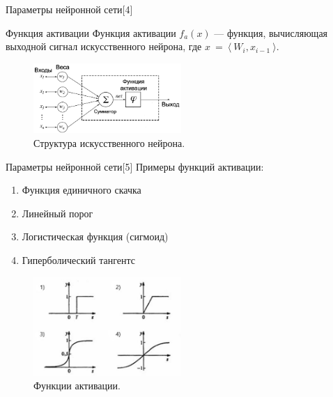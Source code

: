 \documentclass{beamer}
\begin{document}
\begin{frame}{Параметры нейронной сети[4]}
\begin{block}{Функция активации}
Функция активации $f_a(x)$ --- функция, вычисляющая выходной сигнал искусственного нейрона, где $x~=~\langle~W_i, x_{i-1}~\rangle$.
\end{block}

\begin{figure}[h]
    \centering
  \includegraphics[width=0.5\textwidth]{nuron_model.png}
  \caption{Структура искусственного нейрона.}
  \label{fig:neuron}
\end{figure}

\end{frame}






\begin{frame}{Параметры нейронной сети[5]}
Примеры функций активации:
\begin{enumerate}
\item Функция единичного скачка
\item Линейный порог
\item Логистическая функция (сигмоид)
\item Гиперболический тангентс
\end{enumerate}

\begin{figure}[h]
    \centering
  \includegraphics[width=0.5\textwidth]{activation_functions.jpg}
  \caption{Функции активации.}
  \label{fig:activations}
\end{figure}

\end{frame}
\end{document}
